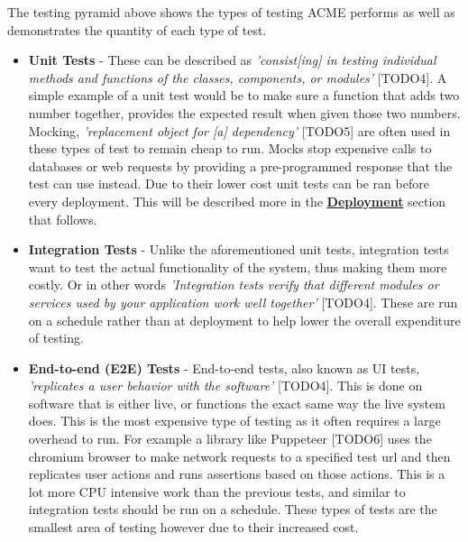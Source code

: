   The testing pyramid above shows the types of testing ACME performs as well as demonstrates the quantity of each type of test.
  \begin{itemize}
    \item \textbf{Unit Tests} - These can be described as \textit{'consist[ing] in testing individual methods and functions of the classes, components, 
    or modules'} [TODO4]. A simple example of a unit test would be to make sure a function that adds two number together, provides the expected result
    when given those two numbers. Mocking, \textit{'replacement object for [a] dependency'} [TODO5] are often used in these types of test to remain cheap
    to run. Mocks stop expensive calls to databases or web requests by providing a pre-programmed response that the test can use instead. Due to their 
    lower cost unit tests can be ran before every deployment. This will be described more in the \hyperref[sec:Deployment]{\textbf{Deployment}} 
    section that follows.

    \item \textbf{Integration Tests} - Unlike the aforementioned unit tests, integration tests want to test the actual functionality of the system, thus 
    making them more costly. Or in other words \textit{'Integration tests verify that different modules or services used by your application work well
    together'} [TODO4]. These are run on a schedule rather than at deployment to help lower the overall expenditure of testing. 
  
    \item \textbf{End-to-end (E2E) Tests} - End-to-end tests, also known as UI tests, \textit{'replicates a user behavior with the software'} [TODO4].
    This is done on software that is either live, or functions the exact same way the live system does. This is the most expensive type of testing as
    it often requires a large overhead to run. For example a library like Puppeteer [TODO6] uses the chromium browser to make network requests to a 
    specified test url and then replicates user actions and runs assertions based on those actions. This is a lot more CPU intensive work than the 
    previous tests, and similar to integration tests should be run on a schedule. These types of tests are the smallest area of testing however due 
    to their increased cost.
  \end{itemize}

